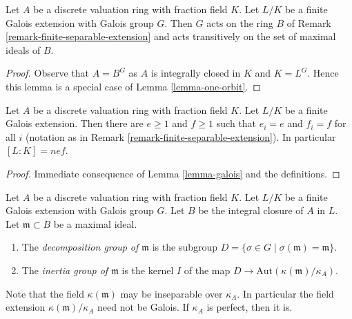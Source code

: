 \begin{lemma}
\label{lemma-galois}
Let $A$ be a discrete valuation ring with fraction field $K$.
Let $L/K$ be a finite Galois extension with Galois group $G$.
Then $G$ acts on the ring $B$ of Remark \ref{remark-finite-separable-extension}
and acts transitively on the set of maximal ideals of $B$.
\end{lemma}

\begin{proof}
Observe that $A = B^G$ as $A$ is integrally closed in $K$ and $K = L^G$.
Hence this lemma is a special case of Lemma \ref{lemma-one-orbit}.
\end{proof}

\begin{lemma}
\label{lemma-galois-conclusion}
Let $A$ be a discrete valuation ring with fraction field $K$.
Let $L/K$ be a finite Galois extension. Then there are $e \geq 1$ and
$f \geq 1$ such that $e_i = e$ and $f_i = f$ for all $i$ (notation
as in Remark \ref{remark-finite-separable-extension}). In particular
$[L : K] = n e f$.
\end{lemma}

\begin{proof}
Immediate consequence of Lemma \ref{lemma-galois} and the definitions.
\end{proof}

\begin{definition}
\label{definition-decomposition-inertia}
Let $A$ be a discrete valuation ring with fraction field $K$.
Let $L/K$ be a finite Galois extension with Galois group $G$.
Let $B$ be the integral closure of $A$ in $L$.
Let $\mathfrak m \subset B$ be a maximal ideal.
\begin{enumerate}
\item The {\it decomposition group of $\mathfrak m$}
is the subgroup $D = \{\sigma \in G \mid \sigma(\mathfrak m) = \mathfrak m\}$.
\item The {\it inertia group of $\mathfrak m$} is the kernel $I$ of the map
$D \to \text{Aut}(\kappa(\mathfrak m)/\kappa_A)$.
\end{enumerate}
\end{definition}

\noindent
Note that the field $\kappa(\mathfrak m)$ may be inseparable over $\kappa_A$.
In particular the field extension $\kappa(\mathfrak m)/\kappa_A$
need not be Galois. If $\kappa_A$ is perfect, then it is.

